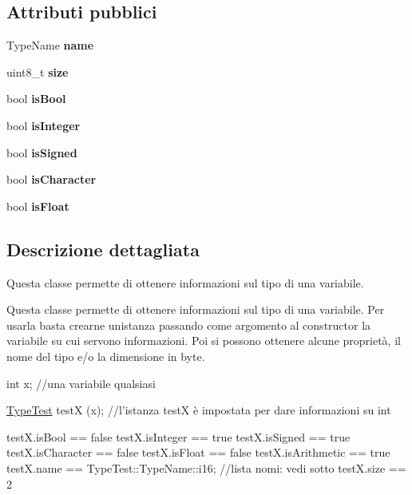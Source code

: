 \subsection*{Attributi pubblici}
\begin{DoxyCompactItemize}
\item 
\mbox{\label{struct_type_test_a1706a350c1f78c963698f9d0b5d80afb}} 
Type\+Name {\bfseries name}
\item 
\mbox{\label{struct_type_test_adc26eb5ff7b8f3627f2e7730aa500f04}} 
uint8\+\_\+t {\bfseries size}
\item 
\mbox{\label{struct_type_test_a195ad98e6ac25a1d9173db5703930763}} 
bool {\bfseries is\+Bool}
\item 
\mbox{\label{struct_type_test_ab19fc53546386ac6f1a7fd9df14ea26f}} 
bool {\bfseries is\+Integer}
\item 
\mbox{\label{struct_type_test_a3d89ed1787d73b5c184d81a4eed18572}} 
bool {\bfseries is\+Signed}
\item 
\mbox{\label{struct_type_test_af439bfe0d6f56f517e85ec64ef16302e}} 
bool {\bfseries is\+Character}
\item 
\mbox{\label{struct_type_test_acf779fb021ccb05f2bfbde73fcc5feb1}} 
bool {\bfseries is\+Float}
\end{DoxyCompactItemize}


\subsection{Descrizione dettagliata}
Questa classe permette di ottenere informazioni sul tipo di una variabile. 

Questa classe permette di ottenere informazioni sul tipo di una variabile. Per usarla basta crearne un\textquotesingle{}istanza passando come argomento al constructor la variabile su cui servono informazioni. Poi si possono ottenere alcune proprietà, il nome del tipo e/o la dimensione in byte. 
\begin{DoxyCode}
\textcolor{keywordtype}{int} x; \textcolor{comment}{//una variabile qualsiasi}

\hyperlink{struct_type_test}{TypeTest} testX (x); \textcolor{comment}{//l'istanza testX è impostata per dare informazioni su int}

testX.isBool                 ==  \textcolor{keyword}{false}
testX.isInteger              ==  \textcolor{keyword}{true}
testX.isSigned               ==  \textcolor{keyword}{true}
testX.isCharacter            ==  \textcolor{keyword}{false}
testX.isFloat                ==  \textcolor{keyword}{false}
testX.isArithmetic           ==  \textcolor{keyword}{true}
testX.name                   ==  TypeTest::TypeName::i16; \textcolor{comment}{//lista nomi: vedi sotto}
testX.size                   ==  2
\end{DoxyCode}


